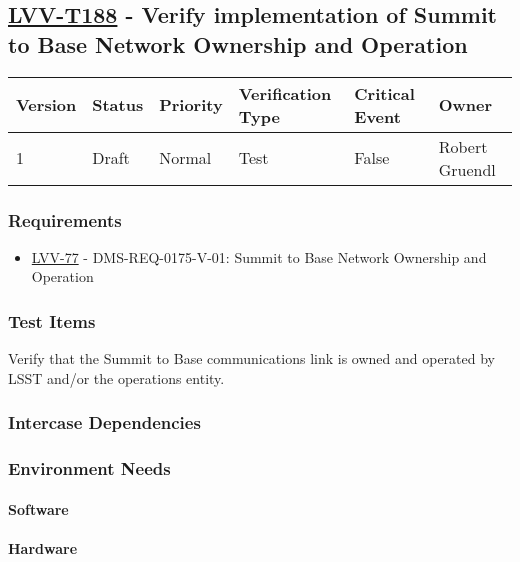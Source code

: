 \subsection{\href{https://jira.lsstcorp.org/secure/Tests.jspa\#/testCase/LVV-T188}{LVV-T188}
    - Verify implementation of Summit to Base Network Ownership and Operation}\label{lvv-t188}

\begin{longtable}[]{llllll}
\toprule
Version & Status & Priority & Verification Type & Critical Event & Owner
\\\midrule
1 & Draft & Normal &
Test & False & Robert Gruendl
\\\bottomrule
\end{longtable}

\subsubsection{Requirements}
\begin{itemize}
\item \href{https://jira.lsstcorp.org/browse/LVV-77}{LVV-77} - DMS-REQ-0175-V-01: Summit to Base Network Ownership and Operation
\end{itemize}

\subsubsection{Test Items}
Verify that the Summit to Base communications link is owned and operated
by LSST and/or the operations entity.



\subsubsection{Intercase Dependencies}

\subsubsection{Environment Needs}

\paragraph{Software}

\paragraph{Hardware}

